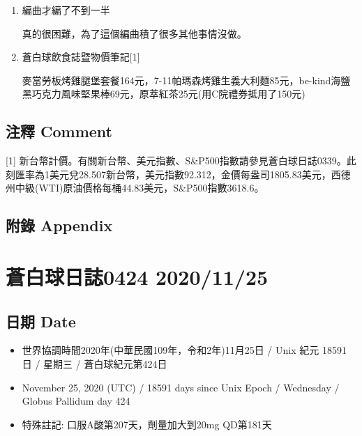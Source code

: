 \documentclass[
]{article}
\providecommand{\tightlist}{%
  \setlength{\itemsep}{0pt}\setlength{\parskip}{0pt}}
\begin{document}
\begin{enumerate}
\def\labelenumi{\arabic{enumi}.}
\item
  編曲才編了不到一半

  真的很困難，為了這個編曲積了很多其他事情沒做。
\item
  蒼白球飲食誌暨物價筆記{[}1{]}

  麥當勞板烤雞腿堡套餐164元，7-11帕瑪森烤雞生義大利麵85元，be-kind海鹽黑巧克力風味堅果棒69元，原萃紅茶25元(用C院禮券抵用了150元)
\end{enumerate}

\hypertarget{ux6ce8ux91cb-comment-17}{%
\subsection{注釋 Comment}\label{ux6ce8ux91cb-comment-17}}

{[}1{]}
新台幣計價。有關新台幣、美元指數、S\&P500指數請參見蒼白球日誌0339。此刻匯率為1美元兌28.507新台幣，美元指數92.312，金價每盎司1805.83美元，西德州中級(WTI)原油價格每桶44.83美元，S\&P500指數3618.6。

\hypertarget{ux9644ux9304-appendix-17}{%
\subsection{附錄 Appendix}\label{ux9644ux9304-appendix-17}}

\hypertarget{ux84bcux767dux7403ux65e5ux8a8c0424-20201125}{%
\section{蒼白球日誌0424
2020/11/25}\label{ux84bcux767dux7403ux65e5ux8a8c0424-20201125}}

\hypertarget{ux65e5ux671f-date-18}{%
\subsection{日期 Date}\label{ux65e5ux671f-date-18}}

\begin{itemize}
\tightlist
\item
  世界協調時間2020年(中華民國109年，令和2年)11月25日 / Unix 紀元 18591
  日 / 星期三 / 蒼白球紀元第424日
\item
  November 25, 2020 (UTC) / 18591 days since Unix Epoch / Wednesday /
  Globus Pallidum day 424
\item
  特殊註記: 口服A酸第207天，劑量加大到20mg QD第181天
\end{itemize}
\end{document}
